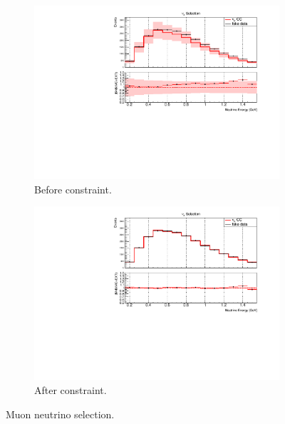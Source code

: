 \begin{figure}[H] 
\begin{center}
    \begin{subfigure}[b]{0.45\textwidth}
    \centering
    \includegraphics[width=1.00\textwidth]{Fakedata/set4/nue_numu_reco_e_H1_mc_fakedata_set4_numu_before_data_constraint.pdf}
    \caption{\label{fig:fakedata:set4:numu_before_constrain} Before constraint.}
    \end{subfigure}
    \begin{subfigure}[b]{0.45\textwidth}
    \centering
    \includegraphics[width=1.00\textwidth]{Fakedata/set4/nue_numu_reco_e_H1_mc_fakedata_set4_scaled_numu.pdf}
    \caption{\label{fig:fakedata:set4:numu_after_constrain} After constraint.}
    \end{subfigure}
\caption{\label{fig:fakedata:set4:numu_const} Muon neutrino selection.}
\end{center}
\end{figure}

